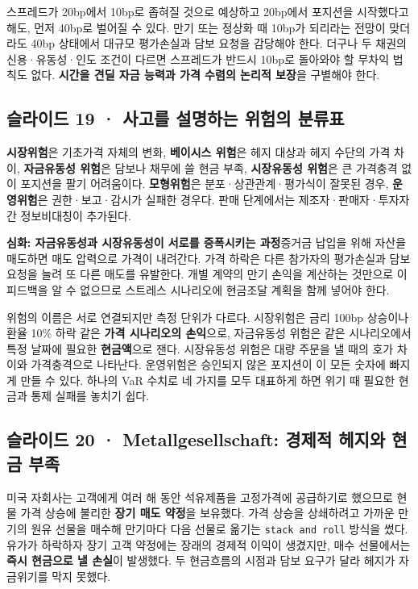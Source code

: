 \documentclass[11pt,a4paper]{article}
\begin{document}
스프레드가 20bp에서 10bp로 좁혀질 것으로 예상하고 20bp에서 포지션을 시작했다고 해도, 먼저 40bp로 벌어질 수 있다. 만기 또는 정상화 때 10bp가 되리라는 전망이 맞더라도 40bp 상태에서 대규모 평가손실과 담보 요청을 감당해야 한다. 더구나 두 채권의 신용·유동성·인도 조건이 다르면 스프레드가 반드시 10bp로 돌아와야 할 무차익 법칙도 없다. \textbf{시간을 견딜 자금 능력과 가격 수렴의 논리적 보장}을 구별해야 한다.\par

\subsection{슬라이드 19 · 사고를 설명하는 위험의 분류표}
\textbf{시장위험}은 기초가격 자체의 변화, \textbf{베이시스 위험}은 헤지 대상과 헤지 수단의 가격 차이, \textbf{자금유동성 위험}은 담보나 채무에 쓸 현금 부족, \textbf{시장유동성 위험}은 큰 가격충격 없이 포지션을 팔기 어려움이다. \textbf{모형위험}은 분포·상관관계·평가식이 잘못된 경우, \textbf{운영위험}은 권한·보고·감시가 실패한 경우다. 판매 단계에서는 제조자·판매자·투자자 간 정보비대칭이 추가된다.\par

\par\medskip\noindent\textbf{심화: 자금유동성과 시장유동성이 서로를 증폭시키는 과정}\quad 증거금 납입을 위해 자산을 매도하면 매도 압력으로 가격이 내려간다. 가격 하락은 다른 참가자의 평가손실과 담보 요청을 늘려 또 다른 매도를 유발한다. 개별 계약의 만기 손익을 계산하는 것만으로 이 피드백을 알 수 없으므로 스트레스 시나리오에 현금조달 계획을 함께 넣어야 한다.\par

위험의 이름은 서로 연결되지만 측정 단위가 다르다. 시장위험은 금리 100bp 상승이나 환율 10\% 하락 같은 \textbf{가격 시나리오의 손익}으로, 자금유동성 위험은 같은 시나리오에서 특정 날짜에 필요한 \textbf{현금액}으로 잰다. 시장유동성 위험은 대량 주문을 낼 때의 호가 차이와 가격충격으로 나타난다. 운영위험은 승인되지 않은 포지션이 이 모든 숫자에 빠지게 만들 수 있다. 하나의 VaR 수치로 네 가지를 모두 대표하게 하면 위기 때 필요한 현금과 통제 실패를 놓치기 쉽다.\par

\subsection{슬라이드 20 · Metallgesellschaft: 경제적 헤지와 현금 부족}
미국 자회사는 고객에게 여러 해 동안 석유제품을 고정가격에 공급하기로 했으므로 현물 가격 상승에 불리한 \textbf{장기 매도 약정}을 보유했다. 가격 상승을 상쇄하려고 가까운 만기의 원유 선물을 매수해 만기마다 다음 선물로 옮기는 \texttt{stack and roll} 방식을 썼다. 유가가 하락하자 장기 고객 약정에는 장래의 경제적 이익이 생겼지만, 매수 선물에서는 \textbf{즉시 현금으로 낼 손실}이 발생했다. 두 현금흐름의 시점과 담보 요구가 달라 헤지가 자금위기를 막지 못했다.\par
\end{document}
